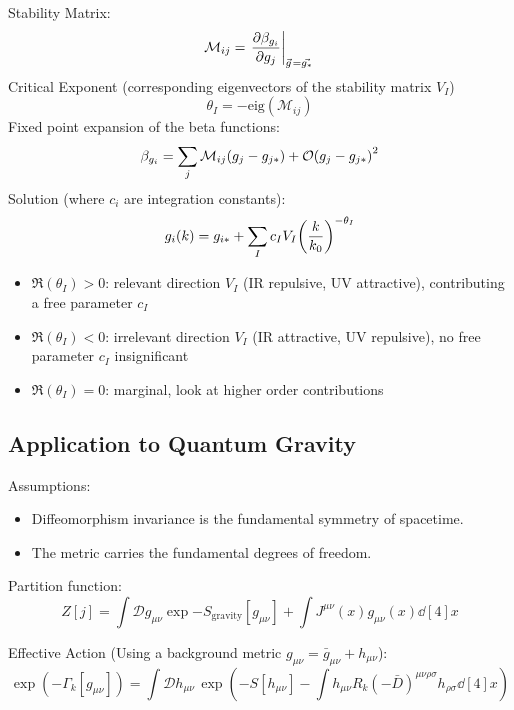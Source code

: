 		\noindent
		Stability Matrix:
		\begin{equation}
			\mathcal{M}_{ij} = \eval{\pdv{\beta_{g_i}}{g_j}}_{\vec{g} = \vec{g_*}}
		\end{equation}
		Critical Exponent (corresponding eigenvectors of the stability matrix $V_I$)
		\begin{equation}
			\theta_I = - \mathrm{eig}(\mathcal{M}_{ij})
		\end{equation}
		Fixed point expansion of the beta functions:
		\begin{equation}
			\beta_{g_i} = \sum_{j} \mathcal{M}_{ij} \qty(g_j - g_{j*}) + \mathcal{O}\qty(g_j - g_{j*})^2
		\end{equation}
		Solution (where $c_i$ are integration constants):
		\begin{equation}
			g_i(k) = g_{i*} + \sum_I c_I V_I \qty(\frac{k}{k_0})^{-\theta_I}
		\end{equation}
		\begin{itemize}
			\item $\Re(\theta_I) > 0$: relevant direction $V_I$ (IR repulsive, UV attractive), contributing a free parameter $c_I$
			\item $\Re(\theta_I) < 0$: irrelevant direction $V_I$ (IR attractive, UV repulsive), no free parameter $c_I$ insignificant
			\item $\Re(\theta_I) = 0$: marginal, look at higher order contributions
		\end{itemize}

	\subsection{Application to Quantum Gravity}
		Assumptions:
		\begin{itemize}
			\item Diffeomorphism invariance is the fundamental symmetry of spacetime.
			\item The metric carries the fundamental degrees of freedom.
		\end{itemize}

		\noindent
		Partition function:
		\begin{equation}
			Z[j] = \int \mathcal{D} g_{\mu\nu} \exp{-S_\text{gravity}[g_{\mu\nu}] + \int J^{\mu\nu}(x) g_{\mu\nu}(x) \dd[4]{x}}
		\end{equation}

		\noindent
		Effective Action (Using a background metric $g_{\mu\nu} = \bar{g}_{\mu\nu} + h_{\mu\nu}$):
		\begin{equation}
			\exp(-\Gamma_k[g_{\mu\nu}]) = \int \mathcal{D}h_{\mu\nu} \, \exp(-S[h_{\mu\nu}] - \int h_{\mu\nu} R_k(-\bar{D})^{\mu\nu\rho\sigma}h_{\rho\sigma} \dd[4]{x})
		\end{equation}


